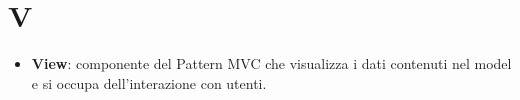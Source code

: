 \section{V}
\begin{itemize} 
	\item
	\textbf{View}: componente del Pattern MVC che visualizza i dati contenuti nel model e si occupa dell'interazione con utenti.
\end{itemize}
